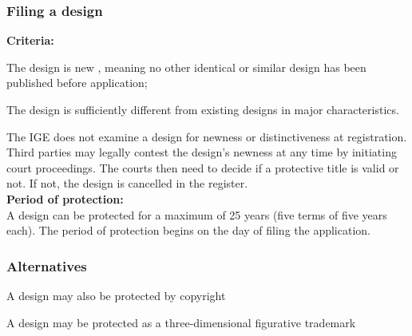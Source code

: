 \subsubsection{Filing a design}
\textbf{Criteria:} 
\begin{compactitem}
	\item The design is new , meaning no other identical or similar design has been	published before application;
	\item The design is sufficiently different from existing designs in major characteristics.
\end{compactitem}
The IGE does not examine a design for newness or distinctiveness at registration. Third parties may legally contest the design’s newness at any time by initiating court proceedings. The courts then need to decide if a protective title is valid
or not. If not, the design is cancelled in the register.\\
\textbf{Period of protection:}\\
A design can be protected for a maximum of 25 years (five terms of five years each). The period of protection begins on the day of filing the application.

\subsubsection{Alternatives}
\begin{compactitem}
	\item A design may also be protected by copyright
	\item A design may be protected as a three-dimensional figurative trademark
\end{compactitem}
